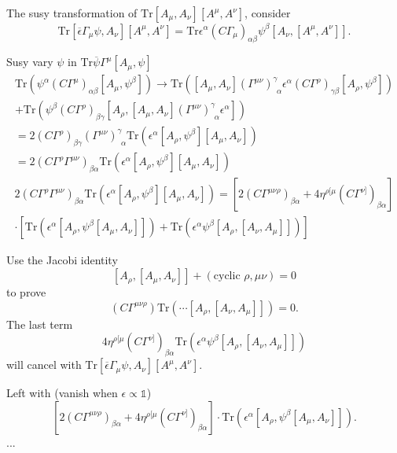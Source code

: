 The susy transformation of $\mathrm{Tr}[A_\mu,A_\nu][A^\mu,A^\nu]$,
consider
\[
	\mathrm{Tr}[\overline{\epsilon}\Gamma_\mu \psi, A_\nu]
	[A^\mu,A^\nu]
	= \mathrm{Tr} \epsilon^{\alpha} (C\Gamma_\mu)_{\alpha\beta}	\psi^\beta
	[A_\nu,[A^\mu,A^\nu]]
.\] 

Susy vary $\psi$ in $\mathrm{Tr} \overline{\psi}\Gamma^\mu[A_\mu,\psi]$
\begin{align*}
	\mathrm{Tr}( \psi^\alpha (C\Gamma^\mu)_{\alpha\beta} [A_\mu,\psi^\beta])
	\to \mathrm{Tr} \left( [A_\mu,A_\nu](\Gamma^{\mu\nu})^\gamma_{~~\alpha} 
	\epsilon^\alpha
(C\Gamma^\rho)_{\gamma\beta}[A_\rho,\psi^\beta]\right) 
\\
+\mathrm{Tr}(\psi^\beta (C\Gamma^\rho)_{\beta\gamma} [A_\rho,
[A_\mu,A_\nu](\Gamma^{\mu\nu})^{\gamma}_{~~\alpha}\epsilon^\alpha])\\
= 2 (C\Gamma^\rho)_{\beta\gamma} (\Gamma^{\mu\nu})^\gamma_{~~\alpha}
\mathrm{Tr}(\epsilon^\alpha [A_\rho,\psi^\beta][A_\mu,A_\nu])\\
= 2 (C\Gamma^\rho \Gamma^{\mu\nu})_{\beta\alpha}
\mathrm{Tr}(\epsilon^\alpha [A_\rho,\psi^\beta][A_\mu,A_\nu])
\end{align*}
\begin{align*}
		2 (C\Gamma^\rho \Gamma^{\mu\nu})_{\beta\alpha}
		\mathrm{Tr}(\epsilon^\alpha [A_\rho,\psi^\beta][A_\mu,A_\nu])
		=\left[ 2 (C \Gamma^{\mu\nu\rho})_{\beta\alpha}
		+ 4 \eta^{\rho[\mu} (C\Gamma^{\nu]})_{\beta\alpha}\right]\\
		\cdot \left[ \mathrm{Tr}(\epsilon^\alpha 
			[A_\rho,\psi^\beta [A_\mu,A_\nu]])
			+ \mathrm{Tr}(\epsilon^\alpha \psi^\beta
			[A_\rho,[A_\nu,A_\mu]])
		\right]
\end{align*}
\begin{info}
	Use the Jacobi identity
	\[
		[A_\rho,[A_\mu,A_\nu]] + (\text{cyclic } \rho,\mu\nu) = 0
	\] 
	to prove
	\[
		(C\Gamma^{\mu\nu\rho}) \mathrm{Tr} ( \cdots
		[A_\rho,[A_\nu,A_\mu]]) = 0
	.\] 
	The last term
	\[
	4 \eta^{\rho[\mu} (C\Gamma^{\nu]})_{\beta\alpha}
	\mathrm{Tr}(\epsilon^\alpha \psi^\beta
		[A_\rho,[A_\nu,A_\mu]])
	\] 
	will cancel with $	\mathrm{Tr}[\overline{\epsilon}\Gamma_\mu \psi, A_\nu]
		[A^\mu,A^\nu]
		$.
\end{info}
Left with (vanish when $\epsilon \propto \mathds{1}$)
\[
\left[ 2 (C \Gamma^{\mu\nu\rho})_{\beta\alpha}
		+ 4 \eta^{\rho[\mu} (C\Gamma^{\nu]})_{\beta\alpha}\right]
		\cdot  \mathrm{Tr}(\epsilon^\alpha 
			[A_\rho,\psi^\beta [A_\mu,A_\nu]])
.\] 
...
